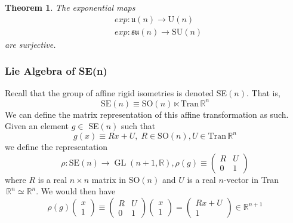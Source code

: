 \documentclass{article}
\DeclareMathOperator{\GL}{GL}
\newtheorem{theorem}{Theorem}[section]
\theoremstyle{remark}
\theoremstyle{definition}
\begin{document}
\begin{theorem}
The exponential maps 
\begin{align*}
    & exp: \mathfrak{u}(n) \longrightarrow \text{U}(n) \\
    & exp: \mathfrak{su}(n) \longrightarrow \text{SU}(n)
\end{align*}
are surjective. 
\end{theorem}

\subsubsection{Lie Algebra of SE(n)}
Recall that the group of affine rigid isometries is denoted SE$(n)$. That is, 
\[\text{SE}(n) \equiv \text{SO}(n) \ltimes \text{Tran}\,\mathbb{R}^n\]
We can define the matrix representation of this affine transformation as such. Given an element $g \in$ SE$(n)$ such that
\[g(x) \equiv R x + U, \; R \in \text{SO}(n), U \in \text{Tran}\, \mathbb{R}^n \]
we define the representation
\[\rho: \text{SE}(n) \longrightarrow \GL(n+1, \mathbb{R}), \rho(g) \equiv \begin{pmatrix}
R&U\\0&1
\end{pmatrix}\]
where $R$ is a real $n\times n$ matrix in SO$(n)$ and $U$ is a real $n$-vector in Tran$\,\mathbb{R}^n \simeq \mathbb{R}^n$. We would then have
\[\rho(g) \begin{pmatrix}
x\\1
\end{pmatrix} \equiv \begin{pmatrix}
R&U\\0&1
\end{pmatrix} \begin{pmatrix}
x\\1
\end{pmatrix} = \begin{pmatrix}
R x + U\\1
\end{pmatrix} \in \mathbb{R}^{n+1}\]
\end{document}

